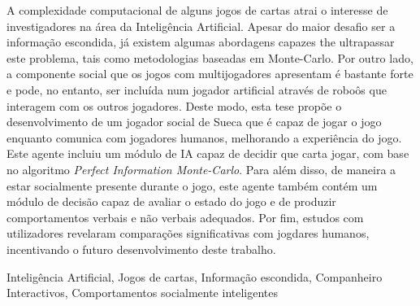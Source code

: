 \begin{resumo}

A complexidade computacional de alguns jogos de cartas atrai o interesse de investigadores na área da Inteligência Artificial.
Apesar do maior desafio ser a informação escondida, já existem algumas abordagens capazes the ultrapassar este problema, tais como metodologias baseadas em Monte-Carlo.
Por outro lado, a componente social que os jogos com multijogadores apresentam é bastante forte e pode, no entanto, ser incluída num jogador artificial através de roboôs que interagem com os outros jogadores.
Deste modo, esta tese propõe o desenvolvimento de um jogador social de Sueca que é capaz de jogar o jogo enquanto comunica com jogadores humanos, melhorando a experiência do jogo.
Este agente incluiu um módulo de IA capaz de decidir que carta jogar, com base no algoritmo \emph{Perfect Information Monte-Carlo}.
Para além disso, de maneira a estar socialmente presente durante o jogo, este agente também contém um módulo de decisão capaz de avaliar o estado do jogo e de produzir comportamentos verbais e não verbais adequados.
Por fim, estudos com utilizadores revelaram comparações significativas com jogdares humanos, incentivando o futuro desenvolvimento deste trabalho.
\end{resumo}

\begin{palavraschave}
Inteligência Artificial, Jogos de cartas, Informação escondida, Companheiro Interactivos, Comportamentos socialmente inteligentes
\end{palavraschave}

\clearpage
\thispagestyle{empty}
\cleardoublepage